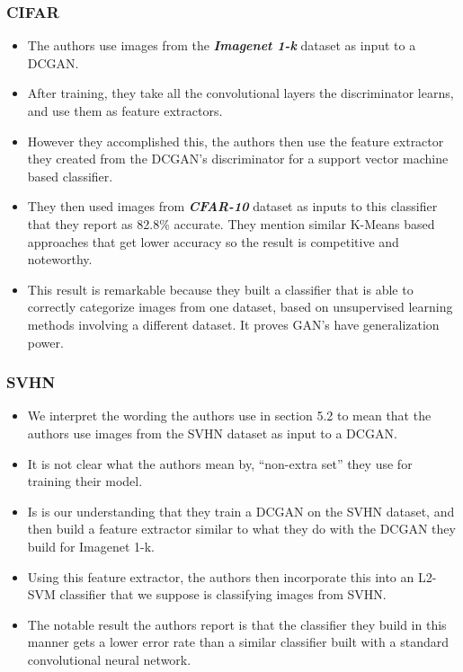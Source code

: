 \documentclass{beamer}
\begin{document}
\begin{frame}[allowframebreaks]
\frametitle{CIFAR}
\begin{itemize}
 \item The authors use images from the \textbf{\textit{Imagenet 1-k}} dataset as input to a DCGAN.
 \item After training, they take all the convolutional layers the discriminator
 learns, and use them as feature extractors. 
 
\item However they accomplished this, the authors then use the feature extractor 
  they created from the DCGAN's discriminator for a support vector machine based
  classifier.
\item They then used images from \textbf{\textit{CFAR-10}} dataset as inputs to this
  classifier that they report as 82.8\% accurate. They mention similar K-Means based
  approaches that get lower accuracy so the result is competitive and noteworthy.
 
\item This result is remarkable because they built a classifier that is able to
  correctly categorize images from one dataset, based on unsupervised learning
  methods involving a different dataset.  It proves GAN's have generalization power.


\end{itemize}
\end{frame}


\begin{frame}[allowframebreaks]
\frametitle{SVHN}
\begin{itemize}
 \item We interpret the wording the authors use in section 5.2 to mean that the
   authors use images from the SVHN dataset as input to a DCGAN.
 \item It is not clear what the authors mean by, ``non-extra set'' they use 
  for training their model.
 \item Is is our understanding that they train a DCGAN on the SVHN dataset, and
  then build a feature extractor similar to what they do with the DCGAN they
  build for Imagenet 1-k.
\item Using this feature extractor, the authors then incorporate this into an
  L2-SVM classifier that we suppose is classifying images from SVHN.
\item The notable result the authors report is that the classifier they build in
  this manner gets a lower error rate than a similar classifier built with a
  standard convolutional neural network.

\end{itemize}
\end{frame}
\end{document}
